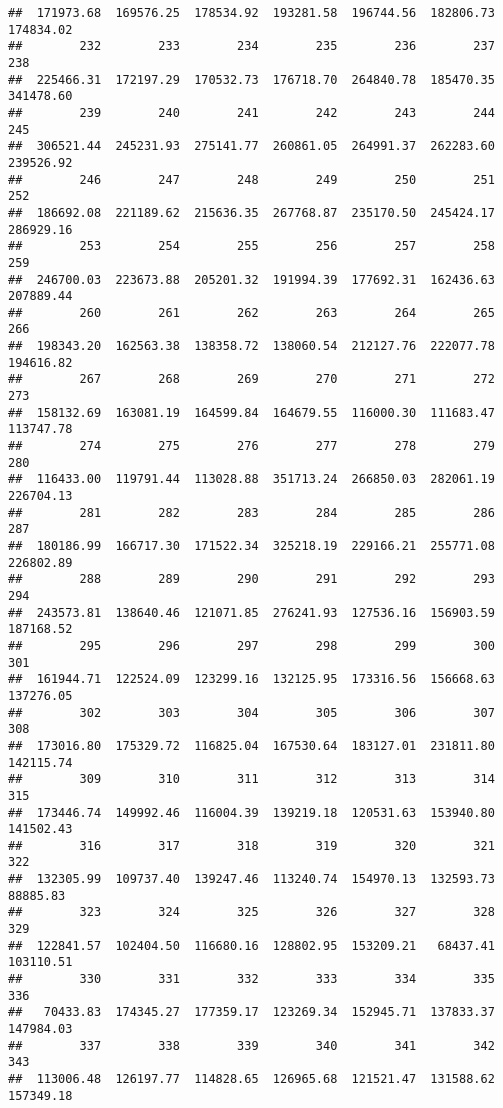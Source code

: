 \documentclass[
]{article}
\begin{document}
\begin{verbatim}
##  171973.68  169576.25  178534.92  193281.58  196744.56  182806.73  174834.02 
##        232        233        234        235        236        237        238 
##  225466.31  172197.29  170532.73  176718.70  264840.78  185470.35  341478.60 
##        239        240        241        242        243        244        245 
##  306521.44  245231.93  275141.77  260861.05  264991.37  262283.60  239526.92 
##        246        247        248        249        250        251        252 
##  186692.08  221189.62  215636.35  267768.87  235170.50  245424.17  286929.16 
##        253        254        255        256        257        258        259 
##  246700.03  223673.88  205201.32  191994.39  177692.31  162436.63  207889.44 
##        260        261        262        263        264        265        266 
##  198343.20  162563.38  138358.72  138060.54  212127.76  222077.78  194616.82 
##        267        268        269        270        271        272        273 
##  158132.69  163081.19  164599.84  164679.55  116000.30  111683.47  113747.78 
##        274        275        276        277        278        279        280 
##  116433.00  119791.44  113028.88  351713.24  266850.03  282061.19  226704.13 
##        281        282        283        284        285        286        287 
##  180186.99  166717.30  171522.34  325218.19  229166.21  255771.08  226802.89 
##        288        289        290        291        292        293        294 
##  243573.81  138640.46  121071.85  276241.93  127536.16  156903.59  187168.52 
##        295        296        297        298        299        300        301 
##  161944.71  122524.09  123299.16  132125.95  173316.56  156668.63  137276.05 
##        302        303        304        305        306        307        308 
##  173016.80  175329.72  116825.04  167530.64  183127.01  231811.80  142115.74 
##        309        310        311        312        313        314        315 
##  173446.74  149992.46  116004.39  139219.18  120531.63  153940.80  141502.43 
##        316        317        318        319        320        321        322 
##  132305.99  109737.40  139247.46  113240.74  154970.13  132593.73   88885.83 
##        323        324        325        326        327        328        329 
##  122841.57  102404.50  116680.16  128802.95  153209.21   68437.41  103110.51 
##        330        331        332        333        334        335        336 
##   70433.83  174345.27  177359.17  123269.34  152945.71  137833.37  147984.03 
##        337        338        339        340        341        342        343 
##  113006.48  126197.77  114828.65  126965.68  121521.47  131588.62  157349.18 

\end{verbatim}
\end{document}
